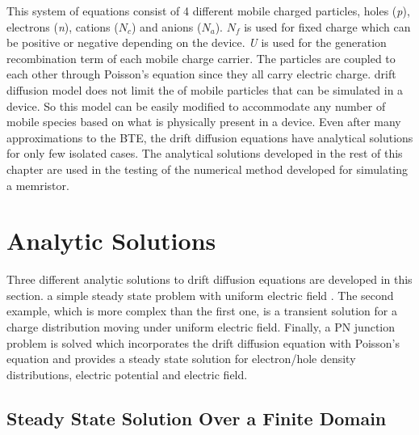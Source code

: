 \begin{doublespace}
This system of equations consist of 4 different mobile charged particles, holes (\textit{p}), electrons (\textit{n}), cations (\textit{$N_{c}$}) and anions (\textit{$N_{a}$}). \textit{$N_{f}$} is used for fixed charge which can be positive or negative depending on the device. \textit{U} is used for the generation recombination term of each mobile charge carrier. The particles are coupled to each other through Poisson's equation since they all carry electric charge.  drift diffusion model does not limit the  of mobile particles that can be simulated in a device. So this model can be easily modified to accommodate any number of mobile species based on what is physically present in a device. Even after many approximations to the BTE, the drift diffusion equations have analytical solutions for only few isolated cases. The analytical solutions developed in the rest of this chapter are used in the testing of the numerical method developed for simulating a memristor. 

\section{Analytic Solutions}

Three different analytic solutions to drift diffusion equations are developed in this section.  a simple steady state problem with uniform electric field . The second example, which is more complex than the first one, is a transient solution for a charge distribution moving under uniform electric field. Finally, a PN junction problem is solved which incorporates the drift diffusion equation with Poisson's equation and provides a steady state solution for electron/hole density distributions, electric potential and electric field. 
  
\subsection{Steady State Solution Over a Finite Domain}


\end{doublespace}
